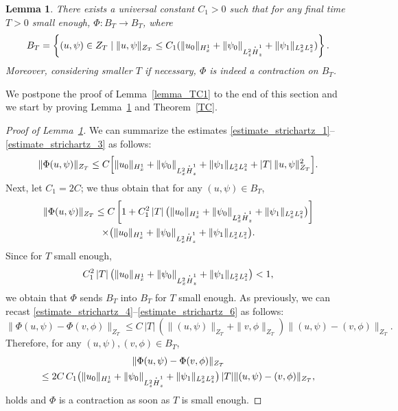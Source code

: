 \documentclass[11pt]{article}
\let\sep\mid
\DeclareRobustCommand{\accentset}[2]{\overset{#1}{#2}}
\newtheorem{lemma}{Lemma}[section]
\theoremstyle{definition}
\newcommand*{\overbigdot}[1]{%
\accentset{\mbox{\large\bfseries .}}{#1}}
\newenvironment{ProofOf}[1]{\begin{proof}[Proof of #1]}{\end{proof}}
\begin{document}
\begin{lemma}\label{lemma_TC2}
There exists a universal constant $C_{1}>0$ such that for any final time $T>0$ small enough, $\Phi:B_{T}\to B_{T}$, where
\[
B_{T}=\left\{(u,\psi)\in Z_{T}\sep \|u,\psi\|_{Z_{T}}\leq C_{1}(\|u_{0}\|_{H_{x}^{1}}+\|\psi_{0}\|_{L_{z}^{2}\overbigdot{H}_{z}^{1}}+\|\psi_{1}\|_{L_{x}^{2}L_{z}^{2}})\right\}.
\]
Moreover, considering smaller $T$ if necessary, $\Phi$ is indeed a contraction on $B_{T}$.
\end{lemma}

We postpone the proof of Lemma~\ref{lemma_TC1} to the end of this section and we start by proving Lemma~\ref{lemma_TC2} and Theorem~\ref{TC}.

\begin{ProofOf}{Lemma~\ref{lemma_TC2}}
We can summarize the estimates \eqref{estimate_strichartz_1}--\eqref{estimate_strichartz_3} as follows:
\[
\|\Phi(u,\psi)\|_{Z_{T}}\leq C\Bigl[\|u_{0}\|_{H_{x}^{1}}+\|\psi_{0}\|_{L_{x}^{2}\overbigdot{H}_{z}^{1}}+\|\psi_{1}\|_{L_{x}^{2}L_{z}^{2}}+|T|\,\|u,\psi\|_{Z_{T}}^{2}\Bigr].
\]
Next, let $C_{1}=2C$; we thus obtain that for any $(u,\psi)\in B_{T}$,
\begin{multline*}
\|\Phi(u,\psi)\|_{Z_{T}}\leq C\left[1+C_{1}^{2}\,|T|\, \bigl(\|u_{0}\|_{H_{x}^{1}}+\|\psi_{0}\|_{L_{x}^{2}\overbigdot{H}_{z}^{1}}+\|\psi_{1}\|_{L_{x}^{2}L_{z}^{2}} \bigr)\right]\\
\times\bigl(\|u_{0}\|_{H_{x}^{1}}+\|\psi_{0}\|_{L_{x}^{2}\overbigdot{H}_{z}^{1}}+\|\psi_{1}\|_{L_{x}^{2}L_{z}^{2}}\bigr).
\end{multline*}
Since for $T$ small enough,
\[
C_{1}^{2}\,|T|\, \bigl(\|u_{0}\|_{H_{x}^{1}}+\|\psi_{0}\|_{L_{x}^{2}\overbigdot{H}_{z}^{1}}+\|\psi_{1}\|_{L_{x}^{2}L_{z}^{2}} \bigr)<1,
\]
we obtain that $\Phi$ sends $B_{T}$ into $B_{T}$ for $T$ small enough. As previously, we can recast \eqref{estimate_strichartz_4}--\eqref{estimate_strichartz_6} as follows:\vspace*{-3pt}
\[
\|\Phi(u,\psi)-\Phi(v,\phi)\|_{Z_{T}}\leq C\,|T|\,\left(\|(u,\psi)\|_{Z_{T}}+\|v,\phi\|_{Z_{T}}\right)\|(u,\psi)-(v,\phi)\|_{Z_{T}}.
\]
Therefore, for any $(u,\psi),(v,\phi)\in B_{T}$,\vspace*{-5pt}
\begin{multline*}
\|\Phi(u,\psi)-\Phi(v,\phi)\|_{Z_{T}}
\\
\leq 2C\,C_{1} \bigl(\|u_{0}\|_{H_{x}^{1}}+\|\psi_{0}\|_{L_{z}^{2}\overbigdot{H}_{z}^{1}}+\|\psi_{1}\|_{L_{x}^{2}L_{z}^{2}} \bigr)\,|T|\|(u,\psi)-(v,\phi)\|_{Z_{T}},
\end{multline*}
holds and $\Phi$ is a contraction as soon as $T$ is small enough.
\end{ProofOf}
\end{document}
